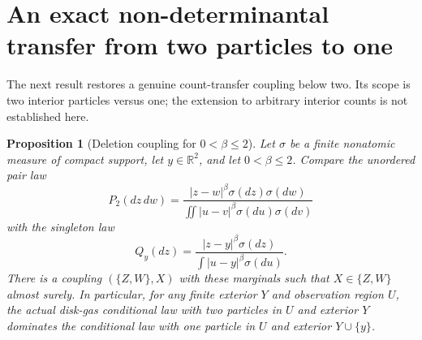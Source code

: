 \documentclass[11pt]{article}
\newtheorem{proposition}[theorem]{Proposition}
\theoremstyle{remark}\newtheorem{remark}[theorem]{Remark}
\begin{document}
\appendix


\section{An exact non-determinantal transfer from two particles to one}
\label{sec:pair-deletion-below-two}

The next result restores a genuine count-transfer coupling below two.
Its scope is two interior particles versus one; the extension to
arbitrary interior counts is not established here.

\begin{proposition}[Deletion coupling for $0<\beta\le2$]
\label{prop:pair-deletion-below-two}
Let $\sigma$ be a finite nonatomic measure of compact support, let
$y\in\mathbb R^2$, and let $0<\beta\le2$.  Compare the unordered pair
law
\[
 P_2(dz\,dw)=\frac{|z-w|^\beta\sigma(dz)\sigma(dw)}
                    {\iint|u-v|^\beta\sigma(du)\sigma(dv)}
\]
with the singleton law
\[
 Q_y(dz)=\frac{|z-y|^\beta\sigma(dz)}
                   {\int|u-y|^\beta\sigma(du)}.
\]
There is a coupling $(\{Z,W\},X)$ with these marginals such that
$X\in\{Z,W\}$ almost surely.  In particular, for any finite exterior
$Y$ and observation region $U$, the actual disk-gas conditional law
with two particles in $U$ and exterior $Y$ dominates the conditional
law with one particle in $U$ and exterior $Y\cup\{y\}$.
\end{proposition}
\end{document}
